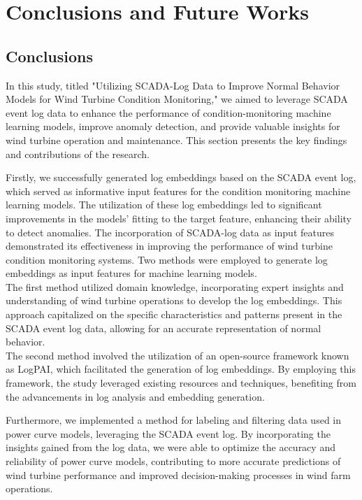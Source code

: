 \chapter{Conclusions and Future Works}
\label{chap:conclusions}

\section{Conclusions}

In this study, titled "Utilizing SCADA-Log Data to Improve Normal Behavior Models for Wind Turbine Condition Monitoring," 
we aimed to leverage SCADA event log data to enhance the performance of condition-monitoring machine learning models, 
improve anomaly detection, and provide valuable insights for wind turbine operation and maintenance. 
This section presents the key findings and contributions of the research. \par

Firstly, we successfully generated log embeddings based on the SCADA event log, which served as informative input features 
for the condition monitoring machine learning models. The utilization of these log embeddings led to significant 
improvements in the models' fitting to the target feature, enhancing their ability to detect anomalies. 
The incorporation of SCADA-log data as input features demonstrated its effectiveness in improving the performance of 
wind turbine condition monitoring systems. Two methods were employed to generate log embeddings as input features for machine learning models. \\
The first method utilized domain knowledge, incorporating expert insights and understanding of wind turbine operations to develop the log embeddings. 
This approach capitalized on the specific characteristics and patterns present in the SCADA event log data, allowing for an accurate representation of normal behavior. \\
The second method involved the utilization of an open-source framework known as LogPAI, which facilitated the generation of log embeddings. 
By employing this framework, the study leveraged existing resources and techniques, benefiting from the advancements in log analysis and embedding generation. 
\par

Furthermore, we implemented a method for labeling and filtering data used in power curve models, leveraging the SCADA event log. 
By incorporating the insights gained from the log data, we were able to optimize the accuracy and reliability of power curve models, 
contributing to more accurate predictions of wind turbine performance and improved decision-making processes in wind farm operations. \par

